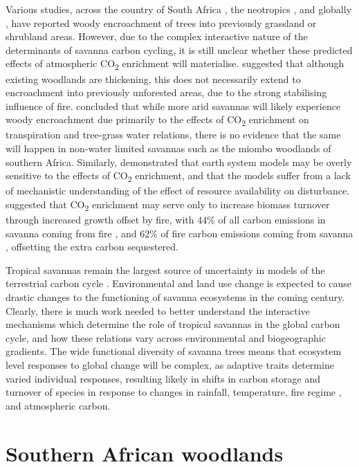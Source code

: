 \begin{refsection}
Various studies, across the country of South Africa \citep{Stevens2016b}, the neotropics \citep{Rosan2019}, and globally \citep{Stevens2016}, have reported woody encroachment of trees into previously grassland or shrubland areas. However, due to the complex interactive nature of the determinants of savanna carbon cycling, it is still unclear whether these predicted effects of atmospheric CO\textsubscript{2} enrichment will materialise. \citet{Lewis2009} suggested that although existing woodlands are thickening, this does not necessarily extend to encroachment into previously unforested areas, due to the strong stabilising influence of fire. \citet{Pelletier2018} concluded that while more arid savannas will likely experience woody encroachment due primarily to the effects of CO\textsubscript{2} enrichment on transpiration and tree-grass water relations, there is no evidence that the same will happen in non-water limited savannas such as the miombo woodlands of southern Africa. Similarly, \citep{Reich2014} demonstrated that earth system models may be overly sensitive to the effects of CO\textsubscript{2} enrichment, and that the models suffer from a lack of mechanistic understanding of the effect of resource availability on disturbance. \citet{Korner2017} suggested that CO\textsubscript{2} enrichment may serve only to increase biomass turnover through increased growth offset by fire, with 44\% of all carbon emissions in savanna coming from fire \citep{Werf2010}, and 62\% of fire carbon emissions coming from savanna \citep{Werf2017}, offsetting the extra carbon sequestered.

Tropical savannas remain the largest source of uncertainty in models of the terrestrial carbon cycle \citep{Ahlstrom2015}. Environmental and land use change is expected to cause drastic changes to the functioning of savanna ecosystems in the coming century. Clearly, there is much work needed to better understand the interactive mechanisms which determine the role of tropical savannas in the global carbon cycle, and how these relations vary across environmental and biogeographic gradients. The wide functional diversity of savanna trees means that ecosystem level responses to global change will be complex, as adaptive traits determine varied individual responses, resulting likely in shifts in carbon storage and turnover of species in response to changes in rainfall, temperature, fire regime , and atmospheric carbon.

\section{Southern African woodlands}
\label{background:sec:southern_african}


\end{refsection}
